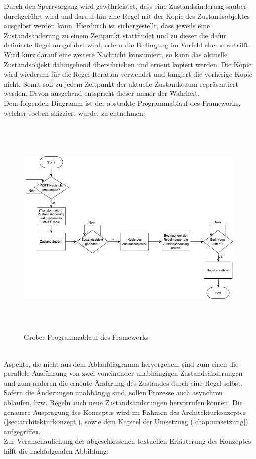         Durch den Sperrvorgang wird gewährleistet, dass eine Zustandsänderung sauber durchgeführt wird und darauf hin eine Regel mit der 
        Kopie des Zustandsobjektes ausgelöst werden kann. Hierdurch ist sichergestellt, dass jeweils eine Zustandsänderung zu einem 
        Zeitpunkt stattfindet und zu dieser die dafür definierte Regel ausgeführt wird, sofern die Bedingung im Vorfeld ebenso zutrifft. 
        Wird kurz darauf eine weitere Nachricht konsumiert, so kann das aktuelle Zustandsobjekt dahingehend überschrieben und erneut 
        kopiert werden. Die Kopie wird wiederum für die Regel-Iteration verwendet und tangiert die vorherige Kopie nicht. Somit soll 
        zu jedem Zeitpunkt der aktuelle Zustandsraum repräsentiert werden. Davon ausgehend entspricht dieser immer der Wahrheit.
        \\
        \linebreak
        Dem folgenden Diagramm ist der abstrakte Programmablauf des Frameworks, welcher soeben skizziert wurde, zu entnehmen:
        \begin{figure}[hbt!]
            \centering
            \includegraphics[width=14cm,height=11cm,keepaspectratio]{images/Programmablauf_Framework.png}
            \caption{Grober Programmablauf des Frameworks}
            \label{fig:programmablauf_framework}
        \end{figure}
        \\
        Aspekte, die nicht aus dem Ablaufdiagramm hervorgehen, sind zum einen die parallele Ausführung von zwei voneinander unabhängigen 
        Zustandsänderungen und zum anderen die erneute Änderung des Zustandes durch eine Regel selbst. Sofern die Änderungen unabhängig 
        sind, sollen Prozesse auch asynchron ablaufen, bzw. Regeln auch neue Zustandsänderungen hervorrufen können. Die genauere Ausprägung des 
        Konzeptes wird im Rahmen des Architekturkonzeptes (\ref{sec:architekturkonzept}), sowie dem Kapitel der Umsetzung 
        (\ref{chap:umsetzung}) aufgegriffen. 
        \\
        Zur Veranschaulichung der abgeschlossenen textuellen Erläuterung des Konzeptes hilft die nachfolgenden Abbildung: 
        